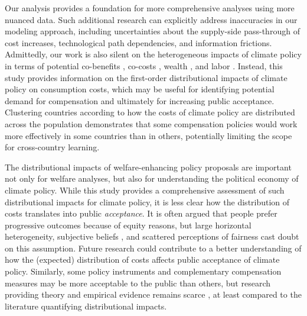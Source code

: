 \documentclass[12pt, a4paper]{article}
\begin{document}
Our analysis provides a foundation for more comprehensive analyses using more nuanced data. Such additional research can explicitly address inaccuracies in our modeling approach, including uncertainties about the supply-side pass-through of cost increases, technological path dependencies, and information frictions. Admittedly, our work is also silent on the heterogeneous impacts of climate policy in terms of potential co-benefits \autocite[e.g.,][]{Holland.2019,Karlsson.2020}, co-costs \autocite[e.g.,][]{Fuje.2019,Greve.2022}, wealth \autocite[e.g.,][]{Fullerton.2011}, and labor \autocite[e.g.,][]{Castellanos.2024}. Instead, this study provides information on the first-order distributional impacts of climate policy on consumption costs, which may be useful for identifying potential demand for compensation and ultimately for increasing public acceptance. Clustering countries according to how the costs of climate policy are distributed across the population demonstrates that some compensation policies would work more effectively in some countries than in others, potentially limiting the scope for cross-country learning. %

The distributional impacts of welfare-enhancing policy proposals are important not only for welfare analyses, but also for understanding the political economy of climate policy. While this study provides a comprehensive assessment of such distributional impacts for climate policy, it is less clear how the distribution of costs translates into public \textit{acceptance}. It is often argued that people prefer progressive outcomes because of equity reasons, but large horizontal heterogeneity, subjective beliefs \autocite{Douenne.2020}, and scattered perceptions of fairness \autocite{MaestreAndres.2019,Povitkina.2021} cast doubt on this assumption. Future research could contribute to a better understanding of how the (expected) distribution of costs affects public acceptance of climate policy. Similarly, some policy instruments and complementary compensation measures may be more acceptable to the public than others, but research providing theory and empirical evidence remains scarce \autocite[e.g.,][]{Sommer.2022,MohammadzadehValencia.2024}, at least compared to the literature quantifying distributional impacts. 
\end{document}

